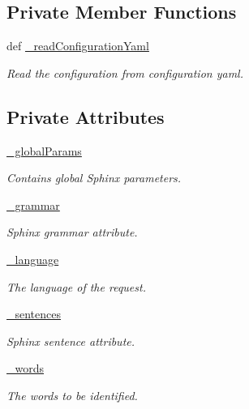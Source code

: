 \subsection*{Private Member Functions}
\begin{DoxyCompactItemize}
\item 
def \hyperlink{classrapp__speech__detection__sphinx4_1_1sphinx4__configuration__params_1_1SphinxConfigurationParams_a7d88fa3ae291b7db2025770ebd8475db}{\-\_\-read\-Configuration\-Yaml}
\begin{DoxyCompactList}\small\item\em Read the configuration from configuration yaml. \end{DoxyCompactList}\end{DoxyCompactItemize}
\subsection*{Private Attributes}
\begin{DoxyCompactItemize}
\item 
\hyperlink{classrapp__speech__detection__sphinx4_1_1sphinx4__configuration__params_1_1SphinxConfigurationParams_ae0cefc8da3538d2e709978c26a1563b5}{\-\_\-global\-Params}
\begin{DoxyCompactList}\small\item\em Contains global Sphinx parameters. \end{DoxyCompactList}\item 
\hyperlink{classrapp__speech__detection__sphinx4_1_1sphinx4__configuration__params_1_1SphinxConfigurationParams_a38df1b7d3f1b19f3fb335ccf1a7e181d}{\-\_\-grammar}
\begin{DoxyCompactList}\small\item\em Sphinx grammar attribute. \end{DoxyCompactList}\item 
\hyperlink{classrapp__speech__detection__sphinx4_1_1sphinx4__configuration__params_1_1SphinxConfigurationParams_a56cc14a8b1f9f7369f5fcd41b892830f}{\-\_\-language}
\begin{DoxyCompactList}\small\item\em The language of the request. \end{DoxyCompactList}\item 
\hyperlink{classrapp__speech__detection__sphinx4_1_1sphinx4__configuration__params_1_1SphinxConfigurationParams_aae72d0d46abac2ff13fe9d6d94e34fdf}{\-\_\-sentences}
\begin{DoxyCompactList}\small\item\em Sphinx sentence attribute. \end{DoxyCompactList}\item 
\hyperlink{classrapp__speech__detection__sphinx4_1_1sphinx4__configuration__params_1_1SphinxConfigurationParams_a668f07761930a1858db80c5711f3c84d}{\-\_\-words}
\begin{DoxyCompactList}\small\item\em The words to be identified. \end{DoxyCompactList}\end{DoxyCompactItemize}


